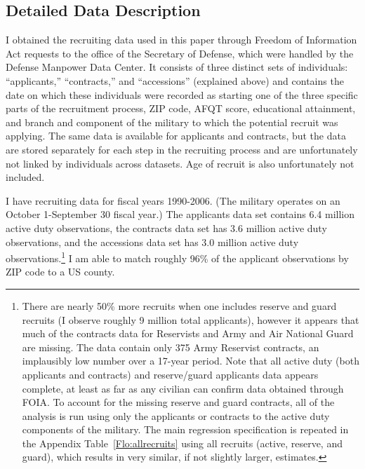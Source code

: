 \documentclass[12pt] {article}
\begin{document}
\setcounter{figure}{0}
\renewcommand{\thefigure}{A\arabic{figure}}


\subsection{Detailed Data Description}

I obtained the recruiting data used in this paper through Freedom
of Information Act requests to the office of the Secretary of Defense, which were handled by the Defense Manpower Data Center. It consists of three
distinct sets of individuals: {}``applicants,'' {}``contracts,''
and {}``accessions'' (explained above) and contains the date on
which these individuals were recorded as starting one of the three
specific parts of the recruitment process, ZIP code, AFQT score, educational
attainment, and branch and component of the military to which the
potential recruit was applying. The same data is available for applicants
and contracts, but the data are stored separately for each step in
the recruiting process and are unfortunately not linked by individuals
across datasets. Age of recruit is also unfortunately not included.

I have recruiting data for fiscal years 1990-2006. (The military operates
on an October 1-September 30 fiscal year.) The applicants data set
contains 6.4 million active duty observations, the contracts data
set has 3.6 million active duty observations, and the accessions data
set has 3.0 million active duty observations.\footnote{There are nearly 50\%
more recruits when one includes reserve and guard recruits (I
observe roughly 9 million total applicants), however it appears that
much of the contracts data for Reservists and Army and Air National
Guard are missing. The data contain only 375 Army Reservist contracts,
an implausibly low number over a 17-year period. Note that all active duty (both applicants and contracts) and reserve/guard applicants data appears complete, at least as far as any civilian can confirm data obtained through FOIA. To account for the missing reserve and guard contracts, all of the analysis is run using only the applicants or contracts to the active duty components of the military. The main regression specification is repeated in the Appendix Table~\ref{Flo:allrecruits} using all recruits (active, reserve, and guard), which results in very similar, if not slightly larger, estimates.} I am able to match roughly 96\% of the applicant observations by ZIP code to a US county.
\end{document}
